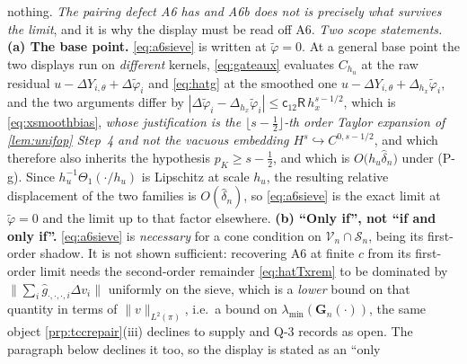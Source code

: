 \begin{remark}
nothing. \emph{The pairing defect A6 has and A6b does not is precisely what survives the limit}, and it
is why the display must be read off A6.
\emph{Two scope statements.} \textbf{(a) The base point.}
\eqref{eq:a6sieve} is written at $\tilde\varphi=0$. At a general base point the two displays run on
\emph{different} kernels, \eqref{eq:gateaux} evaluates $C_{h_u}$ at the raw residual
$u-\Delta Y_{i,\theta}+\Delta\tilde\varphi_i$ and \eqref{eq:hatg} at the smoothed one
$u-\Delta Y_{i,\theta}+\Delta_{h_x}\tilde\varphi_i$, and the two arguments differ by
$|\Delta\tilde\varphi_i-\Delta_{h_x}\tilde\varphi_i|\le\mathsf c_{12}\mathsf R\,h_x^{s-1/2}$, which is
\eqref{eq:xsmoothbias}, \emph{whose justification is the $\lfloor s-\tfrac12\rfloor$-th order Taylor
expansion of \cref{lem:unifop} Step~4 and not the vacuous embedding
$H^{s}\hookrightarrow C^{0,s-1/2}$}, and which therefore also inherits the hypothesis
$p_K\ge s-\tfrac12$, and which is
$O\big(h_u\hat\delta_n\big)$ under (P-g). Since $h_u^{-1}\Theta_1(\cdot/h_u)$ is Lipschitz at scale
$h_u$, the resulting relative displacement of the two families is $O(\hat\delta_n)$, so
\eqref{eq:a6sieve} is the exact limit at $\tilde\varphi=0$ and the limit up to that factor elsewhere.
\textbf{(b) ``Only if'', not ``if and only if''.} \eqref{eq:a6sieve} is \emph{necessary} for a cone
condition on $\mathcal V_n\cap\mathcal S_n$, being its first-order shadow. It is not shown sufficient:
recovering A6 at finite $c$ from its first-order limit needs the second-order remainder
\eqref{eq:hatTxrem} to be dominated by $\|\sum_i\hat g_{\cdot,\cdot,\cdot,i}\Delta v_i\|$ uniformly on the
sieve, which is a \emph{lower} bound on that quantity in terms of $\|v\|_{L^{2}(\pi)}$, i.e.\ a bound
on $\lambda_{\min}(\mathbf G_n(\cdot))$, the same object \cref{prp:tccrepair}(iii) declines to supply
and Q-3 records as open. The paragraph below declines it too, so the display is stated as an ``only

\end{remark}
